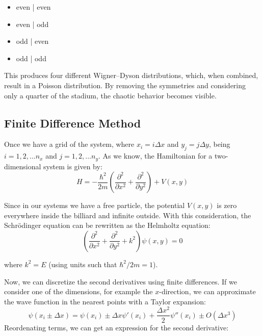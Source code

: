 \begin{itemize}
    \item even | even
    \item even | odd
    \item odd | even
    \item odd | odd
\end{itemize}

This produces four different Wigner--Dyson distributions, which, when combined, result in a Poisson distribution. By removing the symmetries and considering only a quarter of the stadium, the chaotic behavior becomes visible. \cite{wisniacki1999caos}


\subsection{Finite Difference Method}

Once we have a grid of the system, where $x_i = i \Delta x$ and $y_j = j \Delta y$, being $i = 1,2,...n_x$ and $j = 1,2,...n_y$. As we know, the Hamiltonian for a two-dimensional system is given by:
\begin{equation}
    H = -\frac{\hbar^2}{2m} \left( \frac{\partial^2}{\partial x^2} + \frac{\partial^2}{\partial y^2} \right) + V(x,y)
    \label{eq:Hamiltonian_2D}
\end{equation}

Since in our systems we have a free particle, the potential $V(x,y)$ is zero everywhere inside the billiard and infinite outside. With this consideration, the Schrödinger equation can be rewritten as the Helmholtz equation:
\begin{equation}
    \left( \frac{\partial^2}{\partial x^2} + \frac{\partial^2}{\partial y^2} + k^2 \right) \psi(x,y) = 0
    \label{eq:Helmholtz_equation}
\end{equation}

where $k^2 = E$ (using units such that $\hbar^2/2m = 1$).

Now, we can discretize the second derivatives using finite differences.\cite{ledesma2015introduccion} If we consider one of the dimensions, for example the $x$-direction, we can approximate the wave function in the nearest points with a Taylor expansion:
\begin{equation}
    \psi(x_i \pm \Delta x) = \psi(x_i) \pm \Delta x \psi'(x_i) + \frac{\Delta x^2}{2} \psi''(x_i) \pm O(\Delta x^3)
\end{equation}
Reordenating terms, we can get an expression for the second derivative:

